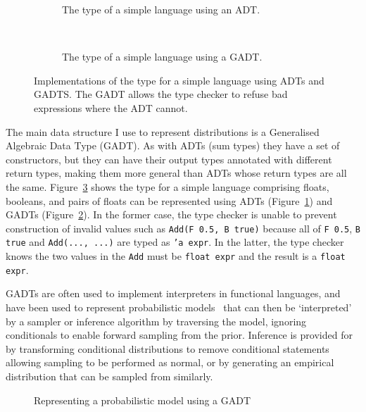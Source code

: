 \documentclass[sigconf]{acmart}
\begin{document}
\begin{figure}
  \centering
  \begin{subfigure}[t]{\columnwidth}
    \caption{\label{lst:adt}The type of a simple language using an ADT.}
  \end{subfigure}
  \quad\\
  \begin{subfigure}[t]{\columnwidth}
    \caption{\label{lst:gadteg}The type of a simple language using a GADT.}
  \end{subfigure}
  \caption{\label{lst:adtgadt}Implementations of the type for a simple language using ADTs and GADTS. The GADT allows the type checker to refuse bad expressions where the ADT cannot.}
\end{figure}

The main data structure I use to represent distributions is a Generalised Algebraic Data Type (GADT). As with ADTs (sum types) they have a set of constructors, but they can have their output types annotated with different return types, making them more general than ADTs whose return types are all the same. Figure~\ref{lst:adtgadt} shows the type for  a simple language comprising floats, booleans, and pairs of floats can be represented using ADTs (Figure~\ref{lst:adt}) and GADTs (Figure~\ref{lst:gadteg}). In the former case, the type checker is unable to prevent construction of invalid values such as \texttt{Add(F 0.5, B true)} because all of \texttt{F 0.5}, \texttt{B true} and \texttt{Add(..., ...)} are typed as \texttt{'a expr}. In the latter, the type checker knows the two values in the \texttt{Add} must be \texttt{float expr} and the result is a \texttt{float expr}.

GADTs are often used to implement interpreters in functional languages, and have been used to represent probabilistic models~\cite{scibior2015practical} that can then be `interpreted' by a sampler or inference algorithm by traversing the model, ignoring conditionals to enable forward sampling from the prior. Inference is provided for by transforming conditional distributions to remove conditional statements allowing sampling to be performed as normal, or by generating an empirical distribution that can be sampled from similarly.

\begin{figure}
  \small
  \caption{\label{lst:gadt}Representing a probabilistic model using a GADT}
\end{figure}
\end{document}
